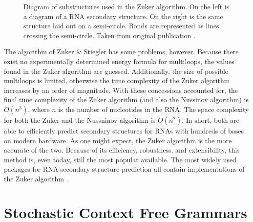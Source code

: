 \documentclass[12pt, a4paper]{article}
\begin{document}
\begin{figure}
\begin{center}
\end{center}
\caption{Diagram of substructures used in the Zuker algorithm. On the left is a diagram of a RNA secondary structure. On the right is the same structure laid out on a semi-circle. Bonds are represented as lines crossing the semi-circle. Taken from original
publication \cite{zuker1981optimal}.}
\label{fig:zuk_struct}
\end{figure}


The algorithm of Zuker \& Stiegler \cite{zuker1981optimal} has some problems, however. Because there exist no experimentally determined energy formula for multiloops, the values found in the Zuker algorithm are guessed. Additionally, the size of possible multiloops is limited, otherwise the time complexity of the Zuker algorithm increases by an order of magnitude. With these concessions accounted for, the final time complexity of the Zuker algorithm (and also the Nussinov algorithm) is $O(n^3)$, where $n$ is the number of nucleotides in the RNA. The space complexity for both the Zuker and the Nussninov algorithm is $O(n^2)$. In short, both are able to efficiently predict secondary structures for RNAs with hundreds of bases on modern hardware. As one might expect, the Zuker algorithm is the more accurate of the two. Because of
its efficiency, robustness, and extensibility, this method is,
even today, still the most popular available. The most widely used packages for RNA secondary structure prediction all contain implementations of the Zuker algorithm \cite{lorenz2011viennarna, reuter2010rnastructure}.


\section{Stochastic Context Free Grammars}
\end{document}

